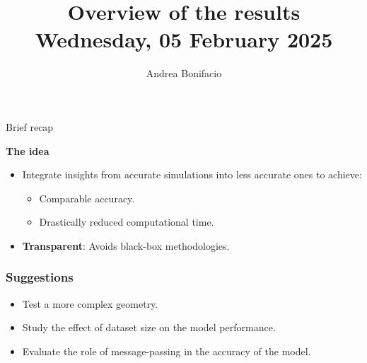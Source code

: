 \documentclass{beamer}
\title{Overview of the results\\
\tiny{Wednesday, 05 February 2025}}
\author{Andrea Bonifacio}
\date{}
\begin{document}
\begin{frame}
\titlepage
\end{frame}


\begin{frame}{Brief recap}

    \textbf{The idea}
    \begin{itemize}
        \item Integrate insights from accurate simulations into less accurate ones to achieve:
        \begin{itemize}
            \item Comparable accuracy.
            \item Drastically reduced computational time.
        \end{itemize}
        \item \textbf{Transparent}: Avoids black-box methodologies.
    \end{itemize}
    
    \vspace{0.5cm}
    
    \end{frame}






\begin{frame}
\frametitle{Suggestions}
\begin{itemize}
    \item Test a more complex geometry.
    \item Study the effect of dataset size on the model performance.
    \item Evaluate the role of message-passing in the accuracy of the model.
\end{itemize}
\end{frame}
\end{document}
